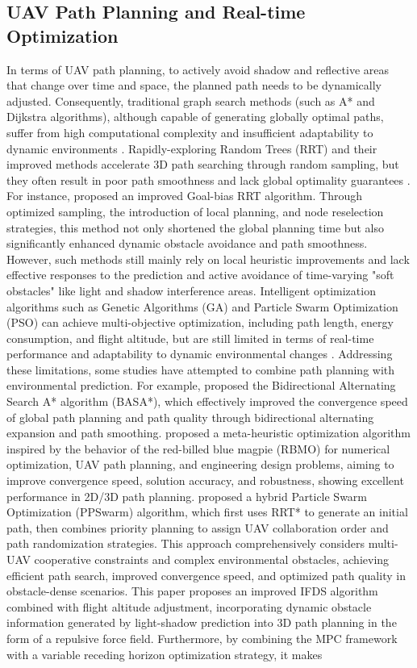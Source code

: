 \documentclass[final,3p,times,numbers]{elsarticle}
\begin{document}
\subsection{UAV Path Planning and Real-time Optimization}
In terms of UAV path planning, to actively avoid shadow and reflective areas that change over time and space, the planned path needs to be dynamically adjusted. Consequently, traditional graph search methods (such as A* and Dijkstra algorithms), although capable of generating globally optimal paths, suffer from high computational complexity and insufficient adaptability to dynamic environments \cite{ref:43,ref:44,ref:55,ref:56}. Rapidly-exploring Random Trees (RRT) and their improved methods accelerate 3D path searching through random sampling, but they often result in poor path smoothness and lack global optimality guarantees \cite{ref:45,ref:57,ref:58,ref:59,ref:60,ref:61}. For instance, \cite{ref:46} proposed an improved Goal-bias RRT algorithm. Through optimized sampling, the introduction of local planning, and node reselection strategies, this method not only shortened the global planning time but also significantly enhanced dynamic obstacle avoidance and path smoothness. However, such methods still mainly rely on local heuristic improvements and lack effective responses to the prediction and active avoidance of time-varying "soft obstacles" like light and shadow interference areas. Intelligent optimization algorithms such as Genetic Algorithms (GA) and Particle Swarm Optimization (PSO) can achieve multi-objective optimization, including path length, energy consumption, and flight altitude, but are still limited in terms of real-time performance and adaptability to dynamic environmental changes \cite{ref:47,ref:48,ref:62,ref:63,ref:64,ref:65}. Addressing these limitations, some studies have attempted to combine path planning with environmental prediction. For example, \cite{ref:49} proposed the Bidirectional Alternating Search A* algorithm (BASA*), which effectively improved the convergence speed of global path planning and path quality through bidirectional alternating expansion and path smoothing. \cite{ref:50} proposed a meta-heuristic optimization algorithm inspired by the behavior of the red-billed blue magpie (RBMO) for numerical optimization, UAV path planning, and engineering design problems, aiming to improve convergence speed, solution accuracy, and robustness, showing excellent performance in 2D/3D path planning. \cite{ref:51} proposed a hybrid Particle Swarm Optimization (PPSwarm) algorithm, which first uses RRT* to generate an initial path, then combines priority planning to assign UAV collaboration order and path randomization strategies. This approach comprehensively considers multi-UAV cooperative constraints and complex environmental obstacles, achieving efficient path search, improved convergence speed, and optimized path quality in obstacle-dense scenarios. This paper proposes an improved IFDS algorithm combined with flight altitude adjustment, incorporating dynamic obstacle information generated by light-shadow prediction into 3D path planning in the form of a repulsive force field. Furthermore, by combining the MPC framework with a variable receding horizon optimization strategy, it makes 
\end{document}
